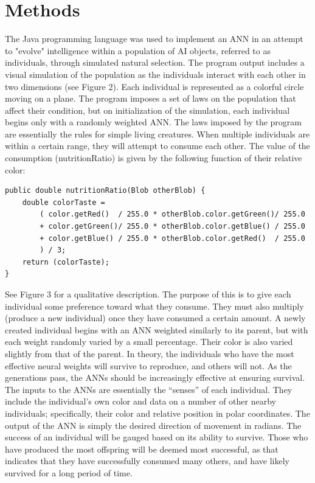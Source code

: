 \documentclass[12pt]{article} %
\newcommand\tab[1][1cm]{\hspace*{#1}} %
\begin{document}
\section{Methods}
The Java programming language was used to implement an ANN in an attempt to "evolve" intelligence within a population of AI objects, referred to as individuals, through simulated natural selection.  The program output includes a visual simulation of the population as the individuals interact with each other in two dimensions (see Figure 2).  Each individual is represented as a colorful circle moving on a plane.  The program imposes a set of laws on the population that affect their condition, but on initialization of the simulation, each individual begins only with a randomly weighted ANN.
\newline
\tab The laws imposed by the program are essentially the rules for simple living creatures.  When multiple individuals are within a certain range, they will attempt to consume each other.  The value of the consumption (nutritionRatio) is given by the following function of their relative color:

\begin{minipage}{90em}
\begin{lstlisting}[style=myJava]
public double nutritionRatio(Blob otherBlob) { 
	double colorTaste = 
		( color.getRed()  / 255.0 * otherBlob.color.getGreen()/ 255.0
		+ color.getGreen()/ 255.0 * otherBlob.color.getBlue() / 255.0 
		+ color.getBlue() / 255.0 * otherBlob.color.getRed()  / 255.0 
		) / 3;
	return (colorTaste); 
} 
\end{lstlisting}
\end{minipage}

See Figure 3 for a qualitative description.  The purpose of this is to give each individual some preference toward what they consume.  They must also multiply (produce a new individual) once they have consumed a certain amount.  A newly created individual begins with an ANN weighted similarly to its parent, but with each weight randomly varied by a small percentage.  Their color is also varied slightly from that of the parent.  In theory, the individuals who have the most effective neural weights will survive to reproduce, and others will not.  As the generations pass, the ANNs should be increasingly effective at ensuring survival. 
\newline
\tab The inputs to the ANNs are essentially the “senses” of each individual.  They include the individual's own color and data on a number of other nearby individuals; specifically, their color and relative position in polar coordinates.  The output of the ANN is simply the desired direction of movement in radians.
\newline
\tab The success of an individual will be gauged based on its ability to survive.  Those who have produced the most offspring will be deemed most successful, as that indicates that they have successfully consumed many others, and have likely survived for a long period of time.
\end{document}
